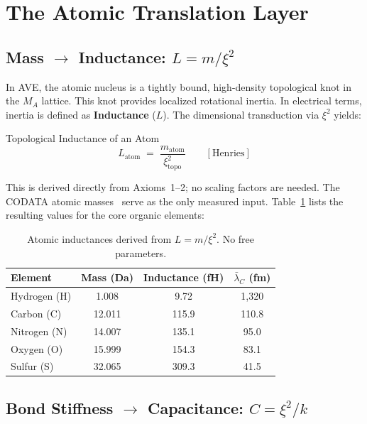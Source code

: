 \section{The Atomic Translation Layer}

\subsection{Mass $\rightarrow$ Inductance:  $L = m / \xi^2$}

In AVE, the atomic nucleus is a tightly bound, high-density topological knot in the $M_A$ lattice. This knot provides localized rotational inertia. In electrical terms, inertia is defined as \textbf{Inductance} ($L$). The dimensional transduction via $\xi^2$ yields:
\begin{resultbox}{Topological Inductance of an Atom}
\begin{equation}
    L_\text{atom} \;=\; \frac{m_\text{atom}}{\xi^2_\text{topo}}
    \qquad [\text{Henries}]
    \label{eq:L_atom}
\end{equation}
\end{resultbox}
This is derived directly from Axioms~1--2; no scaling factors are needed. The CODATA atomic masses~\cite{codata2018} serve as the only measured input. Table~\ref{tab:inductances} lists the resulting values for the core organic elements:

\begin{table}[h]
\centering
\begin{tabular}{lccc}
\hline
\textbf{Element} & \textbf{Mass (Da)} & \textbf{Inductance (fH)} & \textbf{$\bar{\lambda}_C$ (fm)} \\
\hline
Hydrogen (H) & 1.008 & 9.72 & 1,320 \\
Carbon (C)   & 12.011 & 115.9 & 110.8 \\
Nitrogen (N) & 14.007 & 135.1 & 95.0 \\
Oxygen (O)   & 15.999 & 154.3 & 83.1 \\
Sulfur (S)   & 32.065 & 309.3 & 41.5 \\
\hline
\end{tabular}
\caption{Atomic inductances derived from $L = m / \xi^2$. No free parameters.}
\label{tab:inductances}
\end{table}

\subsection{Bond Stiffness $\rightarrow$ Capacitance:  $C = \xi^2 / k$}

